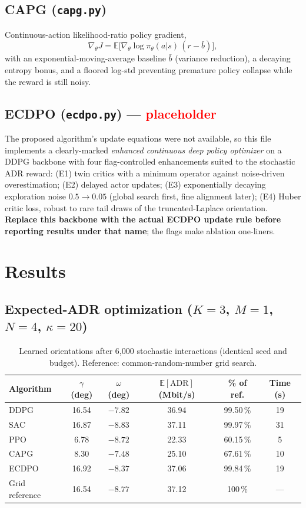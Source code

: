 \documentclass[11pt,a4paper]{article}
\newcommand{\E}{\mathbb{E}}
\begin{document}
\subsection{CAPG (\texttt{capg.py})}
Continuous-action likelihood-ratio policy gradient,
\begin{equation}
\nabla_\theta J=\E\bigl[\nabla_\theta\log\pi_\theta(a|s)\,(r-\bar b)\bigr],
\end{equation}
with an exponential-moving-average baseline $\bar b$ (variance reduction), a
decaying entropy bonus, and a floored log-std preventing premature policy
collapse while the reward is still noisy.

\subsection{ECDPO (\texttt{ecdpo.py}) --- \textcolor{red}{placeholder}}
The proposed algorithm's update equations were not available, so this file
implements a clearly-marked \emph{enhanced continuous deep policy optimizer}
on a DDPG backbone with four flag-controlled enhancements suited to the
stochastic ADR reward: (E1) twin critics with a minimum operator against
noise-driven overestimation; (E2) delayed actor updates; (E3) exponentially
decaying exploration noise $0.5\!\to\!0.05$ (global search first, fine
alignment later); (E4) Huber critic loss, robust to rare tail draws of the
truncated-Laplace orientation. \textbf{Replace this backbone with the actual
ECDPO update rule before reporting results under that name}; the flags make
ablation one-liners.

\section{Results}

\subsection{Expected-ADR optimization ($K=3$, $M=1$, $N=4$, $\kappa=20$)}
\begin{table}[h!]\centering
\caption{Learned orientations after 6{,}000 stochastic interactions
(identical seed and budget). Reference: common-random-number grid search.}
\begin{tabular}{lccccc}
\toprule
Algorithm & $\gamma$ (deg) & $\omega$ (deg) & $\E[\mathrm{ADR}]$ (Mbit/s)
& \% of ref. & Time (s)\\
\midrule
DDPG  & 16.54 & $-7.82$ & 36.94 & 99.50\,\% & 19 \\
SAC   & 16.87 & $-8.83$ & 37.11 & 99.97\,\% & 31 \\
PPO   & 6.78  & $-8.72$ & 22.33 & 60.15\,\% & 5  \\
CAPG  & 8.30  & $-7.48$ & 25.10 & 67.61\,\% & 10 \\
ECDPO & 16.92 & $-8.37$ & 37.06 & 99.84\,\% & 19 \\
\midrule
Grid reference & 16.54 & $-8.77$ & 37.12 & 100\,\% & --- \\
\bottomrule
\end{tabular}
\end{table}
\end{document}
